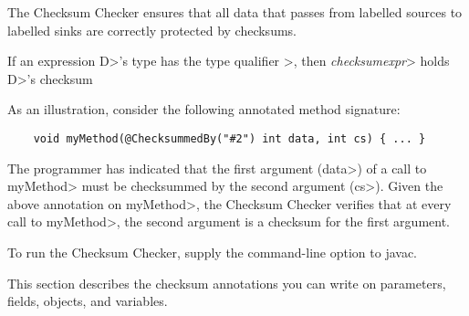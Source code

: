 \htmlhr
{}

The Checksum Checker ensures that all data that passes from labelled sources
to labelled sinks are correctly protected by checksums.

If an expression \<D>'s type has the type qualifier
\<>,
then \<\small\emph{checksumexpr}> holds \<D>'s checksum

As an illustration, consider the following annotated method signature:
\begin{Verbatim}
    void myMethod(@ChecksummedBy("#2") int data, int cs) { ... }
\end{Verbatim}
The programmer has indicated that the first argument (\<data>) of a call to
\<myMethod> must be checksummed by the second argument (\<cs>).
Given the above annotation on \<myMethod>, the Checksum Checker verifies that at
every call to \<myMethod>, the second argument is a checksum for the first argument.

To run the Checksum Checker, supply the
command-line option to javac.


This section describes the checksum annotations you can write on parameters, fields, objects, and variables.


